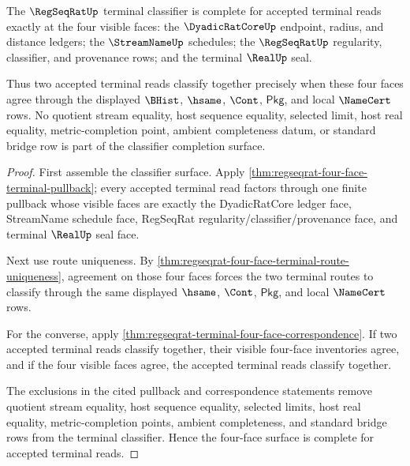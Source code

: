 \begin{theorem}
\label{thm:regseqrat-four-face-terminal-classifier-completeness}
The $\RegSeqRatUp$ terminal classifier is complete for accepted terminal reads
exactly at the four visible faces: the $\DyadicRatCoreUp$ endpoint, radius,
and distance ledgers; the $\StreamNameUp$ schedules; the $\RegSeqRatUp$
regularity, classifier, and provenance rows; and the terminal $\RealUp$ seal.

Thus two accepted terminal reads classify together precisely when these four
faces agree through the displayed $\BHist$, $\hsame$, $\Cont$, $\mathsf{Pkg}$,
and local $\NameCert$ rows. No quotient stream equality, host sequence
equality, selected limit, host real equality, metric-completion point,
ambient completeness datum, or standard bridge row is part of the classifier
completion surface.
\end{theorem}
\begin{proof}
First assemble the classifier surface. Apply
\autoref{thm:regseqrat-four-face-terminal-pullback}; every accepted terminal
read factors through one finite pullback whose visible faces are exactly the
DyadicRatCore ledger face, StreamName schedule face, RegSeqRat
regularity/classifier/provenance face, and terminal $\RealUp$ seal face.

Next use route uniqueness. By
\autoref{thm:regseqrat-four-face-terminal-route-uniqueness}, agreement on
those four faces forces the two terminal routes to classify through the same
displayed $\hsame$, $\Cont$, $\mathsf{Pkg}$, and local $\NameCert$ rows.

For the converse, apply
\autoref{thm:regseqrat-terminal-four-face-correspondence}. If two accepted
terminal reads classify together, their visible four-face inventories agree,
and if the four visible faces agree, the accepted terminal reads classify
together.

The exclusions in the cited pullback and correspondence statements remove
quotient stream equality, host sequence equality, selected limits, host real
equality, metric-completion points, ambient completeness, and standard bridge
rows from the terminal classifier. Hence the four-face surface is complete for
accepted terminal reads.
\end{proof}

